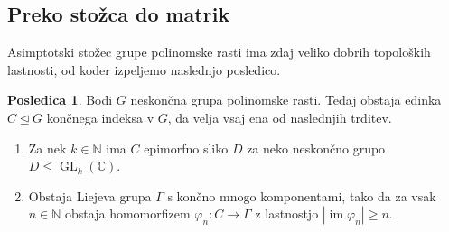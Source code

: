 \documentclass[11pt]{book}
\def\NN{\mathbb{N}}
\def\CC{\mathbb{C}}
\DeclareMathOperator\image{im}
\DeclareMathOperator\GL{GL}
\theoremstyle{definition}
\theoremstyle{zgled}
\theoremstyle{odprtproblem}
\theoremstyle{domacanaloga}
\theoremstyle{izrek}
\newtheorem*{posledica}{Posledica}
\begin{document}
\subsection{Preko stožca do matrik}

Asimptotski stožec grupe polinomske rasti ima zdaj veliko dobrih topoloških lastnosti, od koder izpeljemo naslednjo posledico. 

\begin{posledica}
Bodi $G$ neskončna grupa polinomske rasti. Tedaj obstaja edinka $C \unlhd G$ končnega indeksa v $G$, da velja vsaj ena od naslednjih trditev.
\vspace{-0.5\baselineskip}
\begin{enumerate}[noitemsep]
    \item Za nek $k \in \NN$ ima $C$ epimorfno sliko $D$ za neko neskončno grupo $D \leq \GL_k(\CC)$.
    \item Obstaja Liejeva grupa $\Gamma$ s končno mnogo komponentami, tako da za vsak $n \in \NN$ obstaja homomorfizem $\varphi_n \colon C \to \Gamma$ z lastnostjo $|\image \varphi_n| \geq n$. \vspace{-\baselineskip}
\end{enumerate}
\end{posledica}
\end{document}
